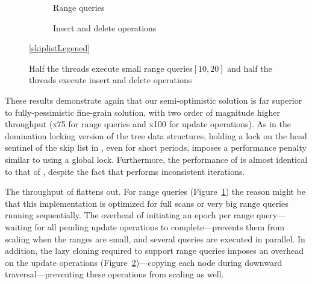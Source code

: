 \begin{figure*}
	\begin{center}
	\begin{subfigure}[t]{.35\textwidth}
		\caption{Range queries} 
		
		\label{evaluation:results:range}
	\end{subfigure}
	\begin{subfigure}[t]{.35\textwidth}
		\caption{Insert and delete operations}
		
		\label{evaluation:results:update}
	\end{subfigure}
	\ref{skiplistLegened}
	\end{center}
\caption{Half the threads execute small range queries$[10,20]$
and half the threads execute insert and delete operations}
\label{evaluation:results:skiplist}
\end{figure*}

% 		
% 		

These results demonstrate again that our semi-optimistic
solution is far superior to fully-pessimistic fine-grain solution, with two
order of magnitude higher throughput (x75 for range queries and x100 for
update operations). As in the domination locking version of the tree data
structures, holding a lock on the head sentinel of the skip list in
\domSkiplist, even for short periods, imposes a performance penalty similar to
using a global lock. Furthermore, the performance of \autoSkiplist is almost
identical to that of \skiplist, despite the fact that \skiplist performs inconsistent iterations.

The throughput of \bronson flattens out. For range queries
(Figure~\ref{evaluation:results:range}) the reason might be that this
implementation is
optimized for full scans or very big range queries running sequentially.
The overhead of initiating an epoch per range query---waiting for all
pending update operations to complete---prevents them from scaling when the
ranges are small, and several queries are executed in parallel. 
In addition, the lazy cloning required to support
range queries imposes an overhead on the update operations
(Figure~\ref{evaluation:results:update})---copying each node during downward
traversal---preventing these operations from scaling as well. 

